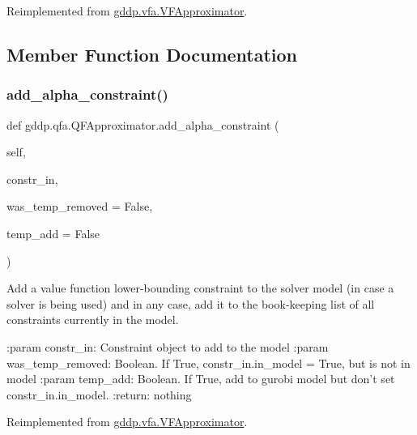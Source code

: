 Reimplemented from \mbox{\hyperlink{classgddp_1_1vfa_1_1_v_f_approximator_abe39aff2fd28268fc81a555b4d362a6b}{gddp.\+vfa.\+V\+F\+Approximator}}.



\subsection{Member Function Documentation}
\mbox{\label{classgddp_1_1qfa_1_1_q_f_approximator_a9a577ac6db94ba649cf8e9be227761cc}} 
\subsubsection{\texorpdfstring{add\_alpha\_constraint()}{add\_alpha\_constraint()}}
{\footnotesize\ttfamily def gddp.\+qfa.\+Q\+F\+Approximator.\+add\+\_\+alpha\+\_\+constraint (\begin{DoxyParamCaption}\item[{}]{self,  }\item[{}]{constr\+\_\+in,  }\item[{}]{was\+\_\+temp\+\_\+removed = {\ttfamily False},  }\item[{}]{temp\+\_\+add = {\ttfamily False} }\end{DoxyParamCaption})}

\begin{DoxyVerb}Add a value function lower-bounding constraint to the solver model (in case a solver is
being used) and in any case, add it to the book-keeping list of all constraints currently in
the model.

:param constr_in: Constraint object to add to the model
:param was_temp_removed: Boolean. If True, constr_in.in_model = True, but is not in model
:param temp_add: Boolean. If True, add to gurobi model but don't set constr_in.in_model.
:return: nothing
\end{DoxyVerb}
 

Reimplemented from \mbox{\hyperlink{classgddp_1_1vfa_1_1_v_f_approximator_a5f5aa5208b059f55b4db350c4d5e1cc5}{gddp.\+vfa.\+V\+F\+Approximator}}.

\mbox{\label{classgddp_1_1qfa_1_1_q_f_approximator_aab82083cc8e6b64cc0bedc47532f865f}} 
